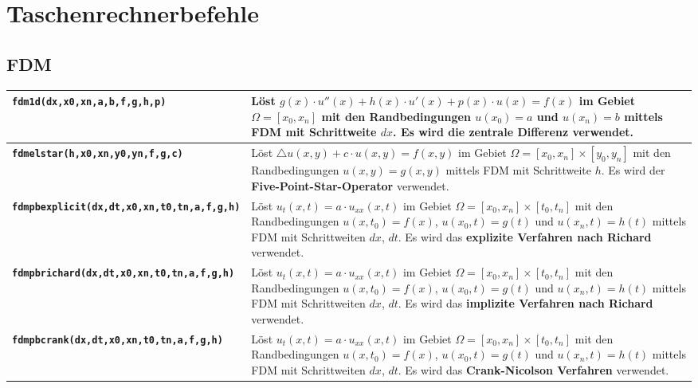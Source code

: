 \section{Taschenrechnerbefehle}
\renewcommand{\arraystretch}{1.5}
\subsection{FDM}
\begin{tabularx}{\textwidth}{l X}
    \hline
    \textbf{\texttt{fdm1d(dx,x0,xn,a,b,f,g,h,p)}}              & Löst $g(x)\cdot u''(x) + h(x)\cdot u'(x)+p(x)\cdot u(x)=f(x)$ im Gebiet $\Omega = [x_0, x_n]$ mit den Randbedingungen $u(x_0)=a$ und $u(x_n)=b$  mittels FDM mit Schrittweite $dx$. Es wird die \textbf{zentrale Differenz} verwendet.                                                                                                                                                    \\\hline
    \textbf{\texttt{fdmelstar(h,x0,xn,y0,yn,f,g,c)}}           & Löst $\triangle u(x,y) + c\cdot u(x,y) = f(x,y)$ im Gebiet $\Omega = [x_0, x_n]\times [y_0,y_n]$ mit den Randbedingungen $u(x,y)=g(x,y)$ mittels FDM mit Schrittweite $h$. Es wird der \textbf{Five-Point-Star-Operator} verwendet.                                                                                                                                                       \\\hline
    \textbf{\texttt{fdmpbexplicit(dx,dt,x0,xn,t0,tn,a,f,g,h)}} & Löst $u_t(x,t) = a\cdot u_{xx}(x,t)$ im Gebiet $\Omega = [x_0, x_n]\times [t_0,t_n]$ mit den Randbedingungen $u(x,t_0)=f(x)$, $u(x_0,t)=g(t)$ und $u(x_n,t)=h(t)$ mittels FDM mit Schrittweiten $dx$, $dt$. Es wird das \textbf{explizite Verfahren nach Richard} verwendet.                                                                                                              \\\hline
    \textbf{\texttt{fdmpbrichard(dx,dt,x0,xn,t0,tn,a,f,g,h)}}  & Löst $u_t(x,t) = a\cdot u_{xx}(x,t)$ im Gebiet $\Omega = [x_0, x_n]\times [t_0,t_n]$ mit den Randbedingungen $u(x,t_0)=f(x)$, $u(x_0,t)=g(t)$ und $u(x_n,t)=h(t)$ mittels FDM mit Schrittweiten $dx$, $dt$. Es wird das \textbf{implizite Verfahren nach Richard} verwendet.                                                                                                              \\\hline
    \textbf{\texttt{fdmpbcrank(dx,dt,x0,xn,t0,tn,a,f,g,h)}}    & Löst $u_t(x,t) = a\cdot u_{xx}(x,t)$ im Gebiet $\Omega = [x_0, x_n]\times [t_0,t_n]$ mit den Randbedingungen $u(x,t_0)=f(x)$, $u(x_0,t)=g(t)$ und $u(x_n,t)=h(t)$ mittels FDM mit Schrittweiten $dx$, $dt$. Es wird das \textbf{Crank-Nicolson Verfahren} verwendet.                                                                                                                      \\\hline

\end{tabularx}
